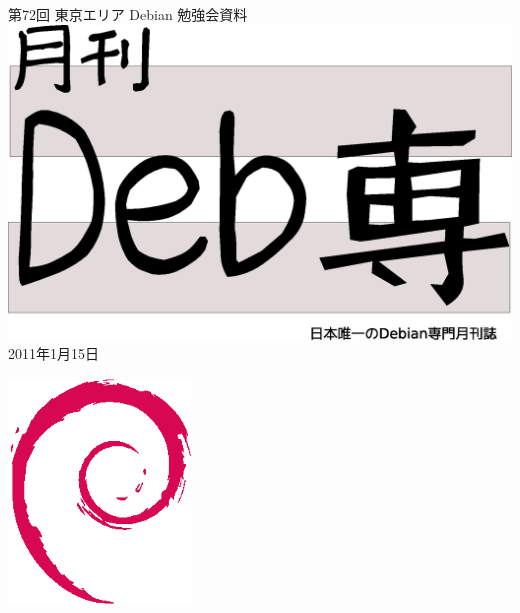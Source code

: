 \documentclass[mingoth,a4paper]{jsarticle}
\newcommand{\debmtgyear}{2011}
\newcommand{\debmtgmonth}{1}
\newcommand{\debmtgdate}{15}
\newcommand{\debmtgnumber}{72}
\begin{document}
\begin{titlepage}
\thispagestyle{empty}

\vspace*{-2cm}
第\debmtgnumber{}回 東京エリア Debian 勉強会資料\\
\hspace*{-2cm}
\includegraphics[width=210mm]{image201003/debsen.eps}\\
\hfill{}\debmtgyear{}年\debmtgmonth{}月\debmtgdate{}日



\vspace*{-2cm}
\hfill{}\includegraphics[height=6cm]{image200502/openlogo-nd.eps}
\end{titlepage}

\end{document}
